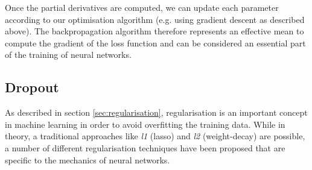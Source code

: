 Once the partial derivatives are computed, we can update each parameter according to our optimisation algorithm (e.g. using gradient descent as described above). 
The backpropagation algorithm therefore represents an effective mean to compute the gradient of the loss function and can be considered an essential part of the training of neural networks. 



%
%

\subsection{Dropout}
As described in section \ref{sec:regularisation}, regularisation is an important concept in machine learning in order to avoid overfitting the training data. While in theory, a traditional approaches like \emph{l1} (lasso) and \emph{l2} (weight-decay) are possible, a number of different regularisation techniques have been proposed that are specific to the mechanics of neural networks. 

